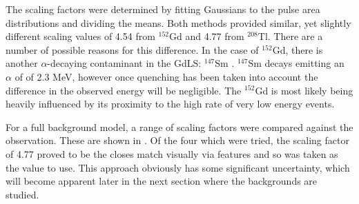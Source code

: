 \par
The scaling factors were determined by fitting Gaussians to the pulse area distributions and dividing the means.
Both methods provided similar, yet slightly different scaling values of 4.54 from ${}^{152}$Gd and 4.77 from ${}^{208}$Tl.
There are a number of possible reasons for this difference.
In the case of ${}^{152}$Gd, there is another $\alpha$-decaying contaminant in the GdLS: ${}^{147}$Sm \cite{scotthaselschwardt_thesis_ref}.
${}^{147}$Sm decays emitting an $\alpha$ of of 2.3 MeV, however once quenching has been taken into account the difference in the observed energy will be negligible.
The ${}^{152}$Gd is most likely being heavily influenced by its proximity to the high rate of very low energy events.
\par
For a full background model, a range of scaling factors were compared against the observation.
These are shown in \cite{fig:od_sim_vs_data_scaling_options}.
Of the four which were tried, the scaling factor of 4.77 proved to be the closes match visually via features and so was taken as the value to use.
This approach obviously has some significant uncertainty, which will become apparent later in the next section where the backgrounds are studied.






